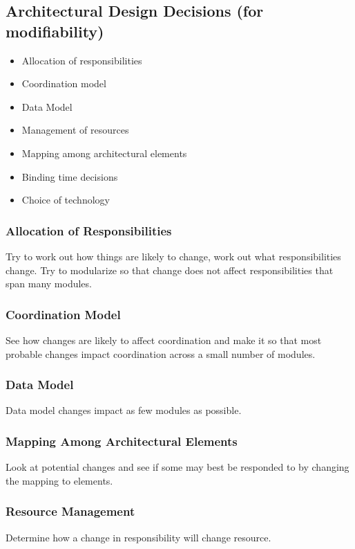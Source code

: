 \documentclass[a4paper]{article}
\begin{document}
\subsection{Architectural Design Decisions (for modifiability)}
\begin{itemize}
\item{Allocation of responsibilities}
\item{Coordination model}
\item{Data Model}
\item{Management of resources}
\item{Mapping among architectural elements}
\item{Binding time decisions}
\item{Choice of technology}
\end{itemize}

\subsubsection{Allocation of Responsibilities}
Try to work out how things are likely to change, work out what responsibilities change.
Try to modularize so that change does not affect responsibilities that span many modules.

\subsubsection{Coordination Model}
See how changes are likely to affect coordination and make it so that most probable changes impact coordination across a small number of modules.  

\subsubsection{Data Model}
Data model changes impact as few modules as possible.

\subsubsection{Mapping Among Architectural Elements}
Look at potential changes and see if some may best be responded to by changing the mapping to elements.

\subsubsection{Resource Management}
Determine how a change in responsibility will change resource.
\end{document}
